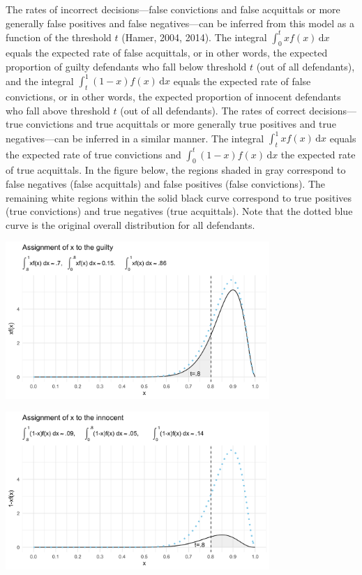 \documentclass[10pt,dvipsnames,enabledeprecatedfontcommands]{scrartcl}
\begin{document}
The rates of incorrect decisions---false convictions and false
acquittals or more generally false positives and false negatives---can
be inferred from this model as a function of the threshold \(t\) (Hamer,
2004, 2014). The integral \(\int_0^t \! xf(x) \, \mathrm{d}x\) equals
the expected rate of false acquittals, or in other words, the expected
proportion of guilty defendants who fall below threshold \(t\) (out of
all defendants), and the integral
\(\int_t^1 \! (1-x)f(x) \, \mathrm{d}x\) equals the expected rate of
false convictions, or in other words, the expected proportion of
innocent defendants who fall above threshold \(t\) (out of all
defendants). The rates of correct decisions---true convictions and true
acquittals or more generally true positives and true negatives---can be
inferred in a similar manner. The integral
\(\int_t^1 \! xf(x) \, \mathrm{d}x\) equals the expected rate of true
convictions and \(\int_0^t \! (1-x)f(x) \, \mathrm{d}x\) the expected
rate of true acquittals. In the figure below, the regions shaded in gray
correspond to false negatives (false acquittals) and false positives
(false convictions). The remaining white regions within the solid black
curve correspond to true positives (true convictions) and true negatives
(true acquittals). Note that the dotted blue curve is the original
overall distribution for all defendants.

\begin{center}
    \includegraphics[width=10cm]{xfx3.png}
\end{center}

\begin{center}
    \includegraphics[width=10cm]{nxfx3.png}
\end{center}
\end{document}

